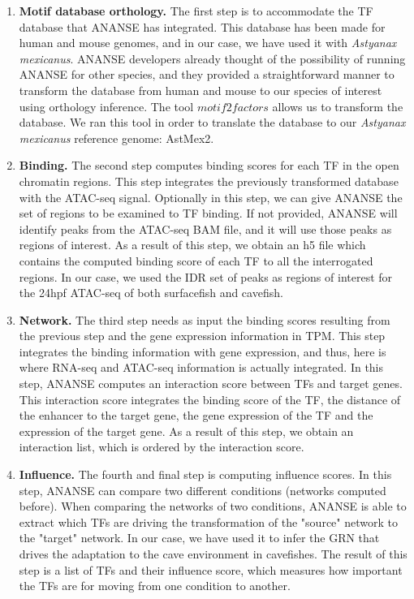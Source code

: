 \begin{enumerate}
\item \textbf{Motif database orthology.} The first step is to accommodate the TF database that ANANSE has integrated. This database has been made for human and mouse genomes, and in our case, we have used it with \textit{Astyanax mexicanus}. ANANSE developers already thought of the possibility of running ANANSE for other species, and they provided a straightforward manner to transform the database from human and mouse to our species of interest using orthology inference. The tool $motif2factors$ allows us to transform the database. We ran this tool in order to translate the database to our \textit{Astyanax mexicanus} reference genome: AstMex2.
\item \textbf{Binding.} The second step computes binding scores for each TF in the open chromatin regions. This step integrates the previously transformed database with the ATAC-seq signal. Optionally in this step, we can give ANANSE the set of regions to be examined to TF binding. If not provided, ANANSE will identify peaks from the ATAC-seq BAM file, and it will use those peaks as regions of interest. As a result of this step, we obtain an h5 file which contains the computed binding score of each TF to all the interrogated regions. In our case, we used the IDR set of peaks as regions of interest for the 24hpf ATAC-seq of both surfacefish and cavefish.
\item \textbf{Network.} The third step needs as input the binding scores resulting from the previous step and the gene expression information in TPM. This step integrates the binding information with gene expression, and thus, here is where RNA-seq and ATAC-seq information is actually integrated. In this step, ANANSE computes an interaction score between TFs and target genes. This interaction score integrates the binding score of the TF, the distance of the enhancer to the target gene, the gene expression of the TF and the expression of the target gene. As a result of this step, we obtain an interaction list, which is ordered by the interaction score.
\item \textbf{Influence.} The fourth and final step is computing influence scores.  In this step, ANANSE can compare two different conditions (networks computed before). When comparing the networks of two conditions, ANANSE is able to extract which TFs are driving the transformation of the "source" network to the "target" network. In our case, we have used it to infer the GRN that drives the adaptation to the cave environment in cavefishes. The result of this step is a list of TFs and their influence score, which measures how important the TFs are for moving from one condition to another.
\end{enumerate}

